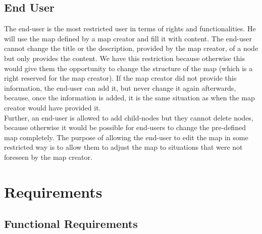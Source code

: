 \subsection{End User}\label{sec:user-class-end-user}
The end-user is the most restricted user in terms of rights and functionalities. He will use the map defined by a map creator and fill it with content. The end-user cannot change the title or the description, provided by the map creator, of a node but only provides the content. We have this restriction because otherwise this would give them the opportunity to change the structure of the map (which is a right reserved for the map creator). If the map creator did not provide this information, the end-user can add it, but never change it again afterwards, because, once the information is added, it is the same situation as when the map creator would have provided it.\\

Further, an end-user is allowed to add child-nodes but they cannot delete nodes, because otherwise it would be possible for end-users to change the pre-defined map completely. The purpose of allowing the end-user to edit the map in some restricted way is to allow them to adjust the map to situations that were not foreseen by the map creator.



\section{Requirements}\label{sec:requirements}

\subsection{Functional Requirements}\label{sec:functional-requirements}

